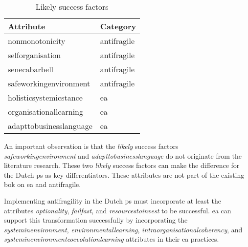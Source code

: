 \begin{table}[H]
	\centering
	\begin{tabular}{@{}ll@{}}
		\toprule
		\textbf{Attribute} & \textbf{Category} \\%
		\midrule
		\Gls{nonmonotonicity} & \Gls{antifragile}  \\%
		\Gls{selforganisation} & \Gls{antifragile}  \\%
		\Gls{senecabarbell} & \Gls{antifragile}  \\%
		\Gls{safeworkingenvironment} & \Gls{antifragile}  \\%
		\Gls{holisticsystemicstance} & \gls{ea}  \\%
		\Gls{organisationallearning} & \gls{ea}  \\%
		\Gls{adapttobusinesslanguage} & \gls{ea}  \\%
		\bottomrule
	\end{tabular}%
	\caption[Likely success factors]{Likely success factors}
	\label{tab:identifiedpossiblefactors}%
\end{table}%
An important observation is that the \textit{likely} success factors \textit{\gls{safeworkingenvironment}} and \textit{\gls{adapttobusinesslanguage}} do not originate from the literature research. These two \textit{likely} success factors can make the difference for the Dutch \gls{ps} as key differentiators. These \glspl{attribute} are not part of the existing \acrlong{bok} on \gls{ea} and \gls{antifragile}.

Implementing \gls{antifragility} in the Dutch \gls{ps} must incorporate at least the \glspl{attribute} \textit{\gls{optionality}}, \textit{\gls{failfast}}, and \textit{\gls{resourcestoinvest}} to be successful. \gls{ea} can support this transformation successfully by incorporating the \textit{\gls{systeminenvironment}}, \textit{\gls{environmentallearning}}, \textit{\gls{intraorganisationalcoherency}}, and \textit{\gls{systeminenvironmentcoevolutionlearning}} attributes in their \gls{ea} practices.

